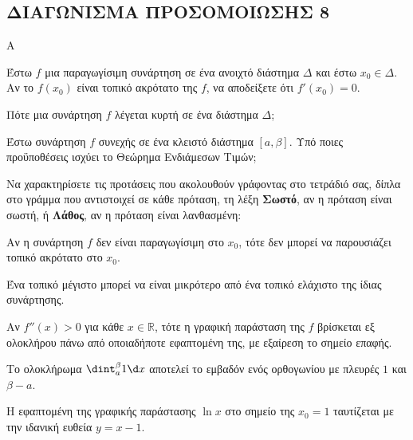 \newpage
\subsection{ΔΙΑΓΩΝΙΣΜΑ ΠΡΟΣΟΜΟΙΩΣΗΣ 8}
\begin{thema}{Α}
\begin{erwthma}
    \item Έστω $f$ μια παραγωγίσιμη συνάρτηση σε ένα ανοιχτό διάστημα $\Delta$ και έστω $x_0 \in \Delta$. Αν το $f(x_0)$ είναι τοπικό ακρότατο της $f$, να αποδείξετε ότι $f'(x_0) = 0$. 
    \item Πότε μια συνάρτηση $f$ λέγεται κυρτή σε ένα διάστημα $\Delta$; 
    \item Έστω συνάρτηση $f$ συνεχής σε ένα κλειστό διάστημα $[a, \beta]$. Υπό ποιες προϋποθέσεις ισχύει το Θεώρημα Ενδιάμεσων Τιμών; 
    \item Να χαρακτηρίσετε τις προτάσεις που ακολουθούν γράφοντας στο τετράδιό σας, δίπλα στο γράμμα που αντιστοιχεί σε κάθε πρόταση, τη λέξη \textbf{Σωστό},
αν η πρόταση είναι σωστή, ή \textbf{Λάθος}, αν η πρόταση είναι λανθασμένη:
    \begin{alist}
        \item Αν η συνάρτηση $f$ δεν είναι παραγωγίσιμη στο $x_0$, τότε δεν μπορεί να παρουσιάζει τοπικό ακρότατο στο $x_0$.
        \item Ένα τοπικό μέγιστο μπορεί να είναι μικρότερο από ένα τοπικό ελάχιστο της ίδιας συνάρτησης.
        \item Αν $f''(x) > 0$ για κάθε $x \in \mathbb{R}$, τότε η γραφική παράσταση της $f$ βρίσκεται εξ ολοκλήρου πάνω από οποιαδήποτε εφαπτομένη της, με εξαίρεση το σημείο επαφής.
        \item Το ολοκλήρωμα $\dint_a^\beta 1 \d x$ αποτελεί το εμβαδόν ενός ορθογωνίου με πλευρές $1$ και $\beta - a$.
        \item Η εφαπτομένη της γραφικής παράστασης $\ln x$ στο σημείο της $x_0 = 1$ ταυτίζεται με την ιδανική ευθεία $y = x - 1$.
    \end{alist} 
\end{erwthma}
\end{thema}

